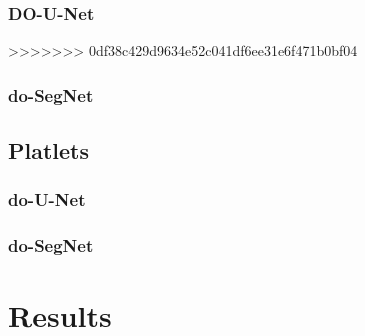 \subsubsection{DO-U-Net}
>>>>>>> 0df38c429d9634e52c041df6ee31e6f471b0bf04



\subsubsection{do-SegNet}



\subsection{Platlets}
\subsubsection{do-U-Net}
\subsubsection{do-SegNet}

% 


\section{Results}
\vspace{0.2in}
\hspace*{0.16in}




